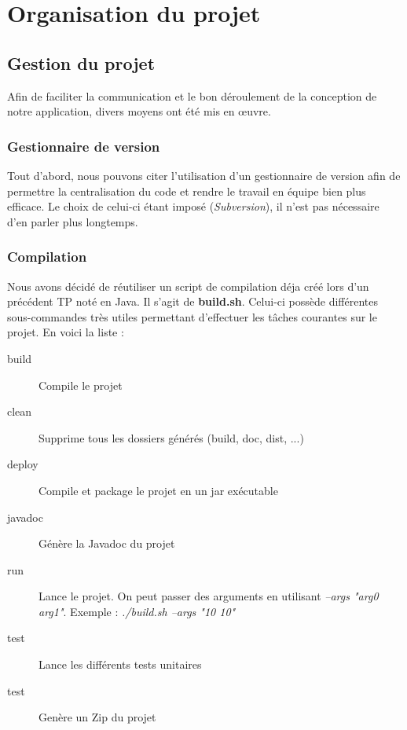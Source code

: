 \chapter{Organisation du projet}

	\section{Gestion du projet}

		Afin de faciliter la communication et le bon déroulement de la conception de notre application, divers moyens ont été mis en œuvre.

		\subsection{Gestionnaire de version}

			Tout d'abord, nous pouvons citer l'utilisation d'un gestionnaire de version afin de permettre la centralisation du code et rendre le travail en équipe bien plus efficace. Le choix de celui-ci étant imposé (\textit{Subversion}), il n'est pas nécessaire d'en parler plus longtemps.

		\subsection{Compilation}

			Nous avons décidé de réutiliser un script de compilation déja créé lors d'un précédent TP noté en Java. Il s'agit de \textbf{build.sh}. Celui-ci possède différentes sous-commandes très utiles permettant d'effectuer les tâches courantes sur le projet. En voici la liste :

			\begin{description}
				\item[build]{Compile le projet}
				\item[clean]{Supprime tous les dossiers générés (build, doc, dist, ...)}
				\item[deploy]{Compile et package le projet en un jar exécutable}
				\item[javadoc]{Génère la Javadoc du projet}
				\item[run]{Lance le projet. On peut passer des arguments en utilisant \textit{--args "arg0 arg1"}. Exemple : \textit{./build.sh --args "10 10"}}
				\item[test]{Lance les différents tests unitaires}
				\item[test]{Genère un Zip du projet}
			\end{description}

